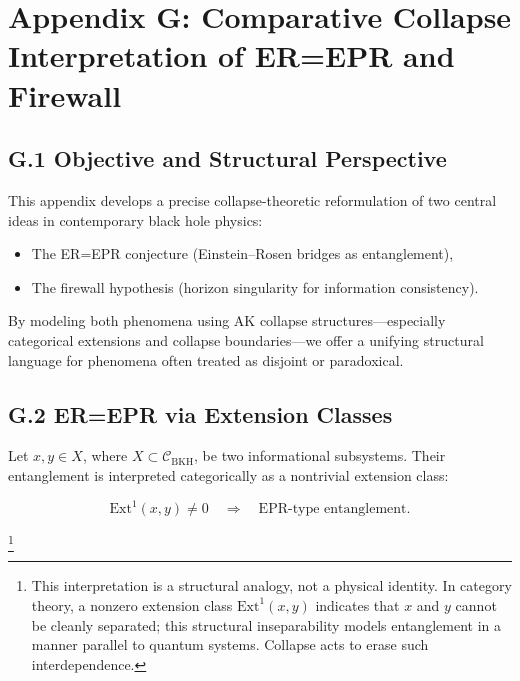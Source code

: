 \documentclass[11pt]{article}
\begin{document}
\section*{Appendix G: Comparative Collapse Interpretation of ER=EPR and Firewall}

\subsection*{G.1 Objective and Structural Perspective}

This appendix develops a precise collapse-theoretic reformulation of two central ideas in contemporary black hole physics:

\begin{itemize}
    \item The ER=EPR conjecture (Einstein–Rosen bridges as entanglement),
    \item The firewall hypothesis (horizon singularity for information consistency).
\end{itemize}

By modeling both phenomena using AK collapse structures—especially categorical extensions and collapse boundaries—we offer a unifying structural language for phenomena often treated as disjoint or paradoxical.

\subsection*{G.2 ER=EPR via Extension Classes}

Let \( x, y \in X \), where \( X \subset \mathcal{C}_{\mathrm{BKH}} \), be two informational subsystems. Their entanglement is interpreted categorically as a nontrivial extension class:

\[
\mathrm{Ext}^1(x, y) \not= 0 \quad \Rightarrow \quad \text{EPR-type entanglement}.
\]

\footnote{
This interpretation is a structural analogy, not a physical identity. In category theory, a nonzero extension class $\mathrm{Ext}^1(x, y)$ indicates that $x$ and $y$ cannot be cleanly separated; this structural inseparability models entanglement in a manner parallel to quantum systems. Collapse acts to erase such interdependence.
}
\end{document}
